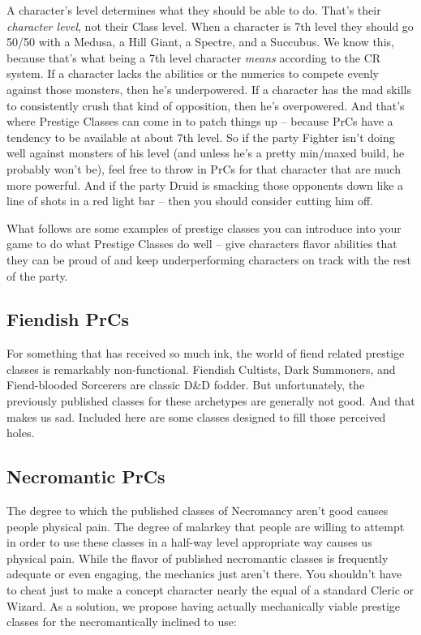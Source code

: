 A character's level determines what they should be able to do. That's their \emph{character level}, not their Class level. When a character is 7th level they should go 50/50 with a Medusa, a Hill Giant, a Spectre, and a Succubus. We know this, because that's what being a 7th level character \emph{means} according to the CR system. If a character lacks the abilities or the numerics to compete evenly against those monsters, then he's underpowered. If a character has the mad skills to consistently crush that kind of opposition, then he's overpowered. And that's where Prestige Classes can come in to patch things up -- because PrCs have a tendency to be available at about 7th level. So if the party Fighter isn't doing well against monsters of his level (and unless he's a pretty min/maxed build, he probably won't be), feel free to throw in PrCs for that character that are much more powerful. And if the party Druid is smacking those opponents down like a line of shots in a red light bar -- then you should consider cutting him off.

What follows are some examples of prestige classes you can introduce into your game to do what Prestige Classes do well -- give characters flavor abilities that they can be proud of and keep underperforming characters on track with the rest of the party.

\subsection{Fiendish PrCs}

For something that has received so much ink, the world of fiend related prestige classes is remarkably non-functional. Fiendish Cultists, Dark Summoners, and Fiend-blooded Sorcerers are classic D\&D fodder. But unfortunately, the previously published classes for these archetypes are generally not good. And that makes us sad. Included here are some classes designed to fill those perceived holes.


\subsection{Necromantic PrCs}

The degree to which the published classes of Necromancy aren't good causes people physical pain. The degree of malarkey that people are willing to attempt in order to use these classes in a half-way level appropriate way causes us physical pain. While the flavor of published necromantic classes is frequently adequate or even engaging, the mechanics just aren't there. You shouldn't have to cheat just to make a concept character nearly the equal of a standard Cleric or Wizard. As a solution, we propose having actually mechanically viable prestige classes for the necromantically inclined to use:
